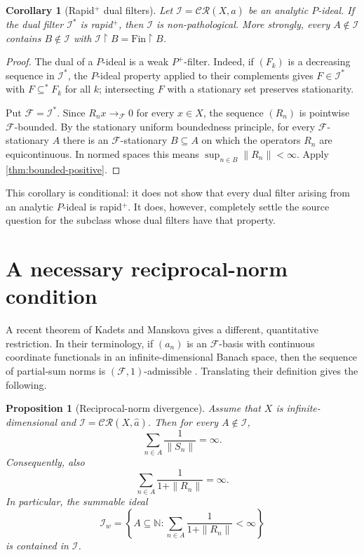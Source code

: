 \documentclass[11pt]{article}
\newtheorem{proposition}[theorem]{Proposition}
\newtheorem{corollary}[theorem]{Corollary}
\theoremstyle{definition}
\theoremstyle{remark}
\newcommand{\N}{\mathbb N}
\newcommand{\I}{\mathcal I}
\newcommand{\CR}{\mathcal{CR}}
\newcommand{\Fin}{\mathrm{Fin}}
\newcommand{\restr}{\mathbin{\upharpoonright}}
\begin{document}
\begin{corollary}[Rapid$^+$ dual filters]\label{cor:rapid}
Let $\I=\CR(X,\widehat a)$ be an analytic $P$-ideal.  If the dual filter
$\I^*$ is rapid$^+$, then $\I$ is non-pathological.  More strongly, every
$A\notin\I$ contains $B\notin\I$ with $\I\restr B=\Fin\restr B$.
\end{corollary}

\begin{proof}
The dual of a $P$-ideal is a weak $P^+$-filter.  Indeed, if $(F_k)$ is a
decreasing sequence in $\I^*$, the $P$-ideal property applied to their
complements gives $F\in\I^*$ with $F\subseteq^*F_k$ for all $k$; intersecting
$F$ with a stationary set preserves stationarity.

Put $\mathcal F=\I^*$.  Since $R_nx\to_{\mathcal F}0$ for every $x\in X$,
the sequence $(R_n)$ is pointwise $\mathcal F$-bounded.  By the stationary
uniform boundedness principle, for every $\mathcal F$-stationary
$A$ there is an $\mathcal F$-stationary $B\subseteq A$ on which the operators
$R_n$ are equicontinuous.  In normed spaces this means
$\sup_{n\in B}\|R_n\|<\infty$.  Apply \cref{thm:bounded-positive}.
\end{proof}

This corollary is conditional: it does not show that every dual filter arising
from an analytic $P$-ideal is rapid$^+$.  It does, however, completely settle
the source question for the subclass whose dual filters have that property.

\section{A necessary reciprocal-norm condition}

A recent theorem of Kadets and Manskova gives a different, quantitative
restriction.  In their terminology, if $(a_n)$ is an $\mathcal F$-basis with
continuous coordinate functionals in an infinite-dimensional Banach space,
then the sequence of partial-sum norms is $(\mathcal F,1)$-admissible
\cite[Theorem 4.3]{KadetsManskova}.  Translating their definition gives the
following.

\begin{proposition}[Reciprocal-norm divergence]\label{prop:reciprocal}
Assume that $X$ is infinite-dimensional and
$\I=\CR(X,\widehat a)$.  Then for every $A\notin\I$,
\[
 \sum_{n\in A}\frac{1}{\|S_n\|}=\infty.
\]
Consequently, also
\[
 \sum_{n\in A}\frac{1}{1+\|R_n\|}=\infty.
\]
In particular, the summable ideal
\[
 \I_w=\left\{A\subseteq\N:
             \sum_{n\in A}\frac{1}{1+\|R_n\|}<\infty\right\}
\]
is contained in $\I$.
\end{proposition}
\end{document}
